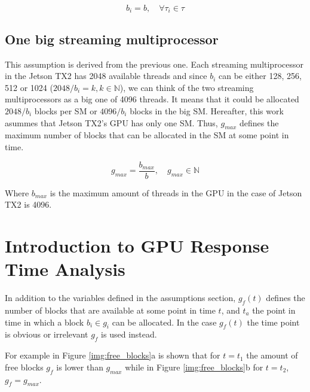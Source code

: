 \documentclass[
  12pt,
  a4paperpaper,
]{report}
\begin{document}
\begin{equation} 
b_i = b, \quad \forall \tau_i \in \tau
\label{eq:blocksize}
\end{equation}

\hypertarget{one-big-streaming-multiprocessor}{%
\subsection{One big streaming
multiprocessor}\label{one-big-streaming-multiprocessor}}

This assumption is derived from the previous one. Each streaming
multiprocessor in the Jetson TX2 has 2048 available threads and since
\(b_i\) can be either 128, 256, 512 or 1024
(\(2048/ b_i = k, k \in \mathbb{N}\)), we can think of the two streaming
multiprocessors as a big one of 4096 threads.
It means that it could be allocated \(2048/b_i\) blocks per SM or
\(4096/b_i\) blocks in the big SM. 
Hereafter, this work asummes that Jetson TX2's GPU has only one SM.
Thus, \(g_{max}\) defines the maximum number of blocks that can be allocated in the SM at some point in time.

\begin{equation} 
g_{max} = \frac{b_{max}}{b}, \quad  g_{max} \in \mathbb{N}
\label{eq:max_grid}
\end{equation}

Where \(b_{max}\) is the maximum amount of threads in the GPU in the
case of Jetson TX2 is 4096.

\hypertarget{introduction-to-gpu-response-time-analysis}{%
\section{Introduction to GPU Response Time
Analysis}\label{introduction-to-gpu-response-time-analysis}}

In addition to the variables defined in the assumptions section, 
\(g_{f}(t)\) defines the number of blocks that are available at some point in
time \(t\), and \(t_a\) the point in time in which a block \(b_i \in g_i\) can be allocated.
In the case \(g_{f}(t)\) the time point is obvious or irrelevant \(g_{f}\) is used instead.

For example in Figure \ref{img:free_blocks}a is shown that for
\(t=t_1\) the amount of free blocks \(g_{f}\) is lower than \(g_{max}\)
while in Figure \ref{img:free_blocks}b for  \(t=t_2\),
\(g_{f} = g_{max}\).
\end{document}

